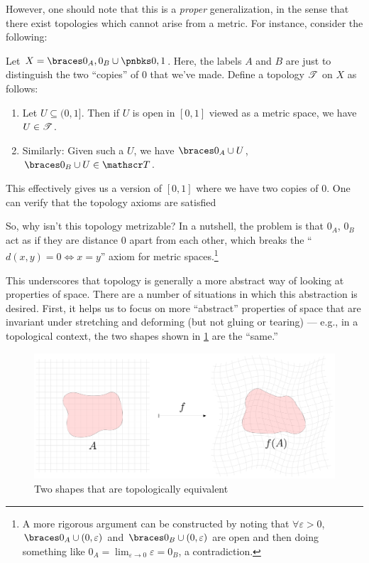 \documentclass{fkpaper}
\begin{document}
\begin{multicols}{2}
However, one should note that this is a \emph{proper} generalization,
in the sense that there exist topologies which cannot arise from a
metric. For instance, consider the following:
\begin{example}
  Let $X = \set{0_{A}, 0_{B}} \cup \pb{0, 1}$. Here, the labels $A$
  and $B$ are just to distinguish the two ``copies'' of $0$ that we've
  made. Define a topology ${\mathscr{T}}$ on $X$ as follows:
  \begin{enumerate}
    \item Let $U \subseteq (0,1]$. Then if $U$ is open in $[0,1]$
      viewed as a metric space, we have $U \in {\mathscr{T}}$.
    \item Similarly: Given such a $U$, we have $\set{0_A} \cup U$,
      $\set{0_B} \cup U \in \ms T$. \qedhere
  \end{enumerate}
\end{example}
This effectively gives us a version of $[0,1]$ where we have two
copies of $0$. One can verify that the topology axioms are satisfied

So, why isn't this topology metrizable? In a nutshell, the problem is
that $0_A$, $0_B$ act as if they are distance $0$ apart from each
other, which breaks the ``$d(x,y) = 0 \iff x = y$'' axiom for metric
spaces.\footnote{A more rigorous argument can be constructed by noting
  that $\forall \varepsilon > 0$, $\set{0_A} \cup (0,\varepsilon)$ and
  $\set{0_B} \cup (0, \varepsilon)$ are open and then doing something
  like $0_A = \lim_{\varepsilon \to 0} \varepsilon = 0_B$, a
  contradiction.}

This underscores that topology is generally a more abstract way of
looking at properties of space. There are a number of situations in
which this abstraction is desired. First, it helps us to focus on
more ``abstract'' properties of space that are invariant under
stretching and deforming (but not gluing or tearing) --- e.g., in a
topological context, the two shapes shown in \cref{fig:deform-grid}
are the ``same.''
\end{multicols}
\begin{figure}[H]
  \centering
  \includegraphics[scale=.325, angle=0]{figures/deform-grid.pdf}
  \caption{Two shapes that are topologically equivalent}
  \label{fig:deform-grid}
\end{figure}
\end{document}
